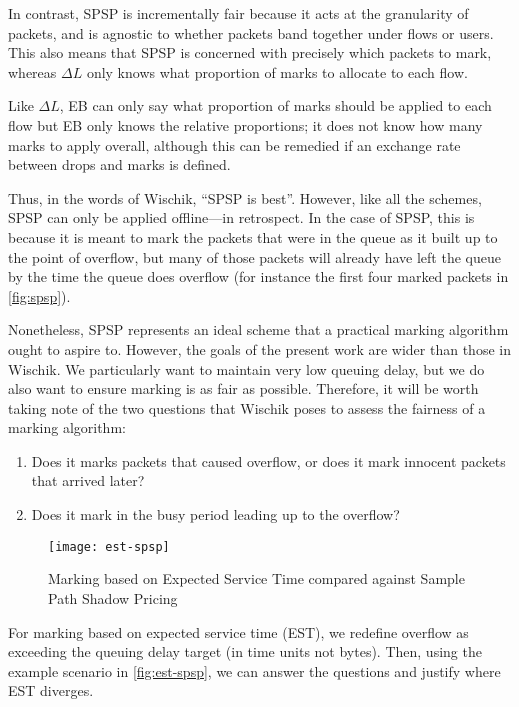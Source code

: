 In contrast, SPSP is incrementally fair because it acts at the granularity of packets, and is agnostic to whether packets band together under flows or users. This also means that SPSP is concerned with precisely which packets to mark, whereas \(\Delta{L}\) only knows what proportion of marks to allocate to each flow.

Like \(\Delta{L}\), EB can only say what proportion of marks should be applied to each flow but EB only knows the relative proportions; it does not know how many marks to apply overall, although this can be remedied if an exchange rate between drops and marks is defined. 

Thus, in the words of Wischik, ``SPSP is best''. However, like all the schemes, SPSP can only be applied offline---in retrospect. In the case of SPSP, this is because it is meant to mark the packets that were in the queue as it built up to the point of overflow, but many of those packets will already have left the queue by the time the queue does overflow (for instance the first four marked packets in \autoref{fig:spsp}).

Nonetheless, SPSP represents an ideal scheme that a practical marking algorithm
ought to aspire to. %
However, the goals of the present work are wider than those in Wischik. We particularly want to maintain very low queuing delay, but we do also want to ensure marking is as fair as possible. Therefore, it will be worth taking note of the two questions that Wischik poses to assess the fairness of a marking algorithm:
\begin{enumerate}[nosep]
	\item Does it marks packets that caused overflow, or does it mark innocent packets that arrived later?
	\item Does it mark in the busy period leading up to the overflow?
\end{enumerate}
\begin{figure}[h]
	\centering
	\texttt{[image: est-spsp]}
	\caption{Marking based on Expected Service Time compared against Sample Path Shadow Pricing}\label{fig:est-spsp}
\end{figure}
For marking based on expected service time (EST), we redefine overflow as exceeding the queuing delay target (in time units not bytes). Then, using the example scenario in \autoref{fig:est-spsp}, we can answer the questions and justify where EST diverges. 

